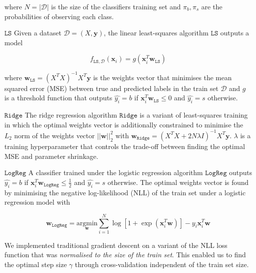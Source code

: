 \documentclass[10pt,conference,compsocconf]{IEEEtran}
\newcommand{\parabf}[1]{\vspace{1mm}\noindent\textbf{#1}}
\newcommand{\Data}{\mathcal{D}}
\newcommand{\features}{\mathbf{x}_i}
\newcommand{\target}{y_i}
\newcommand{\targetvector}{\mathbf{y}}
\newcommand{\weights}{\mathbf{w}}
\newcommand{\classifier}[2]{f_{#1, #2}}
\newcommand{\LeastSquares}{\mathtt{LS}}
\newcommand{\Ridge}{\mathtt{Ridge}}
\newcommand{\LogReg}{\mathtt{LogReg}}
\begin{document}
where $N = |\Data|$ is the size of the classifiers training set and $\pi_b, \pi_s$ are the probabilities of observing each class. 

\parabf{$\LeastSquares$} Given a dataset $\Data = (X, \targetvector)$, the linear least-squares algorithm $\LeastSquares$ outputs a model

\vspace*{-4mm}
\begin{equation}
	\classifier{\LeastSquares}{\Data}(\features) = g(\features^T \weights_{\LeastSquares})
\end{equation}

where $\weights_{\LeastSquares} = (X^T X)^{-1}X^T \targetvector$ is the weights vector that minimises the mean squared error (MSE) between true and predicted labels in the train set $\Data$ and $g$ is a threshold function that outputs $\hat{\target} = b$ if $\features^T \weights_{\LeastSquares} \leq 0$ and $\hat{\target} = s$ otherwise.

\parabf{$\Ridge$} The ridge regression algorithm $\Ridge$ is a variant of least-squares training in which the optimal weights vector is additionally constrained to minimise the $L_2$ norm of the weights vector $||\weights||_2^2$ with $\weights_\Ridge = (X^T X + 2N\lambda I)^{-1}X^T \targetvector$. $\lambda$ is a training hyperparameter that controls the trade-off between finding the optimal MSE and parameter shrinkage.

\parabf{$\LogReg$} A classifier trained under the logistic regression algorithm $\LogReg$ outputs $\hat{\target} = b$ if $\features^T \weights_{\LogReg} \leq \frac{1}{2}$ and $\hat{\target} = s$ otherwise. The optimal weights vector is found by minimising the negative log-likelihood (NLL) of the train set under a logistic regression model with

\vspace*{-4mm}
\begin{equation}
	\weights_\LogReg = \underset{\weights}{\text{argmin}} \sum_{i=1}^{N} \log [ 1 + \exp(\features^T\weights) ] - \target\features^T\weights
\end{equation} 

We implemented traditional gradient descent on a variant of the NLL loss function that was \emph{normalised to the size of the train set}. This enabled us to find the optimal step size $\gamma$ through cross-validation independent of the train set size.
\end{document}
